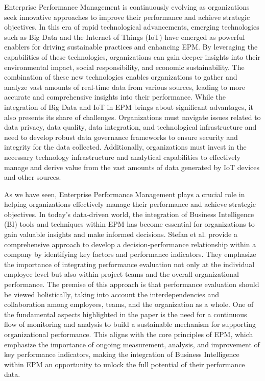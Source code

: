 \documentclass[12pt,a4paper,openright,twoside]{book}
\begin{document}
Enterprise Performance Management is continuously evolving as organizations seek innovative approaches to improve their performance and achieve strategic objectives. 
%
In this era of rapid technological advancements, emerging technologies such as Big Data and the Internet of Things (IoT) have emerged as powerful enablers for driving sustainable practices and enhancing EPM. 
%
By leveraging the capabilities of these technologies, organizations can gain deeper insights into their environmental impact, social responsibility, and economic sustainability. \cite{yang2023bigdata}
%
The combination of these new technologies enables organizations to gather and analyze vast amounts of real-time data from various sources, leading to more accurate and comprehensive insights into their performance.
%
While the integration of Big Data and IoT in EPM brings about significant advantages, it also presents its share of challenges. 
%
Organizations must navigate issues related to data privacy, data quality, data integration, and technological infrastructure and need to develop robust data governance frameworks to ensure security and integrity for the data collected. 
%
Additionally, organizations must invest in the necessary technology infrastructure and analytical capabilities to effectively manage and derive value from the vast amounts of data generated by IoT devices and other sources.

As we have seen, Enterprise Performance Management plays a crucial role in helping organizations effectively manage their performance and achieve strategic objectives. 
%
In today's data-driven world, the integration of Business Intelligence (BI) tools and techniques within EPM has become essential for organizations to gain valuable insights and make informed decisions. 
%
Stefan et al. \cite{stefan2010enterprise} provide a comprehensive approach to develop a decision-performance relationship within a company by identifying key factors and performance indicators. 
%
They emphasize the importance of integrating performance evaluation not only at the individual employee level but also within project teams and the overall organizational performance. 
%
The premise of this approach is that performance evaluation should be viewed holistically, taking into account the interdependencies and collaboration among employees, teams, and the organization as a whole.
%
One of the fundamental aspects highlighted in the paper is the need for a continuous flow of monitoring and analysis to build a sustainable mechanism for supporting organizational performance. 
%
This aligns with the core principles of EPM, which emphasize the importance of ongoing measurement, analysis, and improvement of key performance indicators, making the integration of Business Intelligence within EPM an opportunity to unlock the full potential of their performance data. 
\end{document}
